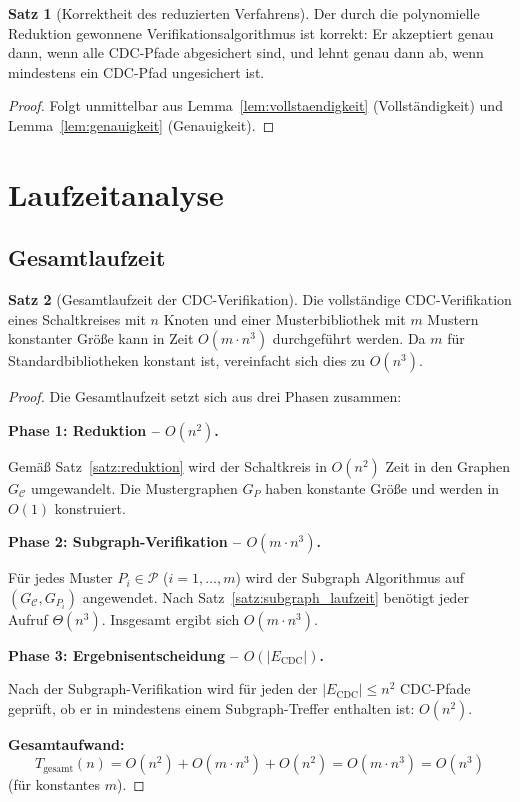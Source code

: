 ﻿\documentclass[a4paper,12pt]{article}
\theoremstyle{definition}
\newtheorem{satz}{Satz}
\begin{document}
	\begin{satz}[Korrektheit des reduzierten Verfahrens]
		\label{satz:korrektheit}
		Der durch die polynomielle Reduktion gewonnene Verifikationsalgorithmus
		ist korrekt: Er akzeptiert genau dann, wenn alle CDC-Pfade abgesichert sind,
		und lehnt genau dann ab, wenn mindestens ein CDC-Pfad ungesichert ist.
	\end{satz}
	
	\begin{proof}
		Folgt unmittelbar aus Lemma~\ref{lem:vollstaendigkeit} (Vollst\"andigkeit)
		und Lemma~\ref{lem:genauigkeit} (Genauigkeit).
	\end{proof}
	
	\section{Laufzeitanalyse}
	
	\subsection{Gesamtlaufzeit}
	
	\begin{satz}[Gesamtlaufzeit der CDC-Verifikation]
		\label{satz:gesamtlaufzeit}
		Die vollst\"andige CDC-Verifikation eines Schaltkreises mit $n$ Knoten
		und einer Musterbibliothek mit $m$ Mustern konstanter Gr\"o\ss{}e kann
		in Zeit $O(m \cdot n^3)$ durchgef\"uhrt werden.
		Da $m$ f\"ur Standardbibliotheken konstant ist, vereinfacht sich dies zu
		$O(n^3)$.
	\end{satz}
	
	\begin{proof}
		Die Gesamtlaufzeit setzt sich aus drei Phasen zusammen:
		
		\medskip
		\textbf{Phase 1: Reduktion -- $O(n^2)$.}
		
		Gem\"a\ss{} Satz~\ref{satz:reduktion} wird der Schaltkreis in $O(n^2)$ Zeit
		in den Graphen $G_{\mathcal{C}}$ umgewandelt. Die Mustergraphen $G_P$
		haben konstante Gr\"o\ss{}e und werden in $O(1)$ konstruiert.
		
		\medskip
		\textbf{Phase 2: Subgraph-Verifikation -- $O(m \cdot n^3)$.}
		
		F\"ur jedes Muster $P_i \in \mathcal{P}$ ($i = 1, \ldots, m$) wird der
		Subgraph Algorithmus auf $(G_{\mathcal{C}}, G_{P_i})$ angewendet.
		Nach Satz~\ref{satz:subgraph_laufzeit} ben\"otigt jeder Aufruf $\Theta(n^3)$.
		Insgesamt ergibt sich $O(m \cdot n^3)$.
		
		\medskip
		\textbf{Phase 3: Ergebnisentscheidung -- $O(|E_{\mathrm{CDC}}|)$.}
		
		Nach der Subgraph-Verifikation wird f\"ur jeden der $|E_{\mathrm{CDC}}| \leq n^2$
		CDC-Pfade gepr\"uft, ob er in mindestens einem Subgraph-Treffer enthalten ist:
		$O(n^2)$.
		
		\medskip
		\textbf{Gesamtaufwand:}
		\[
		T_{\mathrm{gesamt}}(n) = O(n^2) + O(m \cdot n^3) + O(n^2)
		= O(m \cdot n^3) = O(n^3)
		\]
		(f\"ur konstantes $m$). \qedhere
	\end{proof}
	
\end{document}
